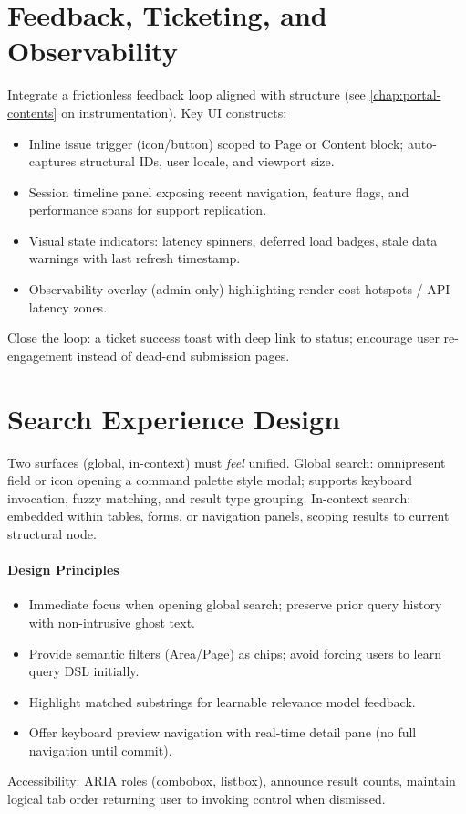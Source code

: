 \section{Feedback, Ticketing, and Observability}
Integrate a frictionless feedback loop aligned with structure (see \cref{chap:portal-contents} on instrumentation). Key UI constructs:
\begin{itemize}
	\item Inline issue trigger (icon/button) scoped to Page or Content block; auto-captures structural IDs, user locale, and viewport size.
	\item Session timeline panel exposing recent navigation, feature flags, and performance spans for support replication.
	\item Visual state indicators: latency spinners, deferred load badges, stale data warnings with last refresh timestamp.
	\item Observability overlay (admin only) highlighting render cost hotspots / API latency zones.
\end{itemize}
Close the loop: a ticket success toast with deep link to status; encourage user re-engagement instead of dead-end submission pages.

\section{Search Experience Design}
Two surfaces (global, in-context) must \textit{feel} unified. Global search: omnipresent field or icon opening a command palette style modal; supports keyboard invocation, fuzzy matching, and result type grouping. In-context search: embedded within tables, forms, or navigation panels, scoping results to current structural node.
\paragraph{Design Principles}
\begin{itemize}
	\item Immediate focus when opening global search; preserve prior query history with non-intrusive ghost text.
	\item Provide semantic filters (Area/Page) as chips; avoid forcing users to learn query DSL initially.
	\item Highlight matched substrings for learnable relevance model feedback.
	\item Offer keyboard preview navigation with real-time detail pane (no full navigation until commit).
\end{itemize}
Accessibility: ARIA roles (combobox, listbox), announce result counts, maintain logical tab order returning user to invoking control when dismissed.

